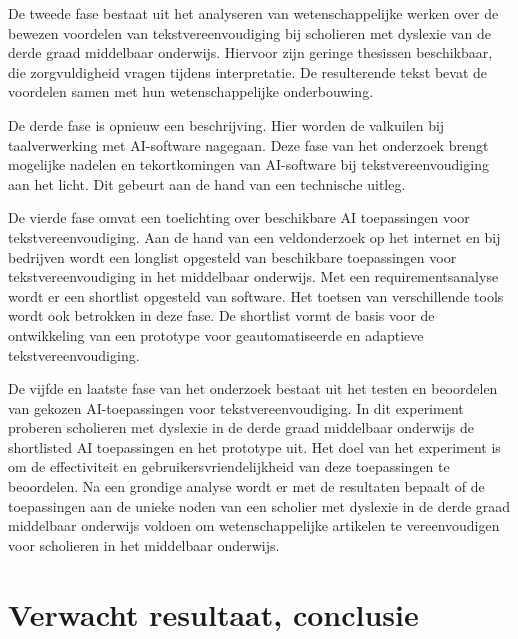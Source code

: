 De tweede fase bestaat uit het analyseren van wetenschappelijke werken over de bewezen voordelen van tekstvereenvoudiging bij scholieren met dyslexie van de derde graad middelbaar onderwijs. Hiervoor zijn geringe thesissen beschikbaar, die zorgvuldigheid vragen tijdens interpretatie. De resulterende tekst bevat de voordelen samen met hun wetenschappelijke onderbouwing.

De derde fase is opnieuw een beschrijving. Hier worden de valkuilen bij taalverwerking met AI-software nagegaan. Deze fase van het onderzoek brengt mogelijke nadelen en tekortkomingen van AI-software bij tekstvereenvoudiging aan het licht. Dit gebeurt aan de hand van een technische uitleg.

De vierde fase omvat een toelichting over beschikbare AI toepassingen voor tekstvereenvoudiging. Aan de hand van een veldonderzoek op het internet en bij bedrijven wordt een longlist opgesteld van beschikbare toepassingen voor tekstvereenvoudiging in het middelbaar onderwijs. Met een requirementsanalyse wordt er een shortlist opgesteld van software. Het toetsen van verschillende tools wordt ook betrokken in deze fase. De shortlist vormt de basis voor de ontwikkeling van een prototype voor geautomatiseerde en adaptieve tekstvereenvoudiging.



De vijfde en laatste fase van het onderzoek bestaat uit het testen en beoordelen van gekozen AI-toepassingen voor tekstvereenvoudiging. In dit experiment proberen scholieren met dyslexie in de derde graad middelbaar onderwijs de shortlisted AI toepassingen en het prototype uit. Het doel van het experiment is om de effectiviteit en gebruikersvriendelijkheid van deze toepassingen te beoordelen. Na een grondige analyse wordt er met de resultaten bepaalt of de toepassingen aan de unieke noden van een scholier met dyslexie in de derde graad middelbaar onderwijs voldoen om wetenschappelijke artikelen te vereenvoudigen voor scholieren in het middelbaar onderwijs.

\section{Verwacht resultaat, conclusie}
\label{sec:verwachte_resultaten}

